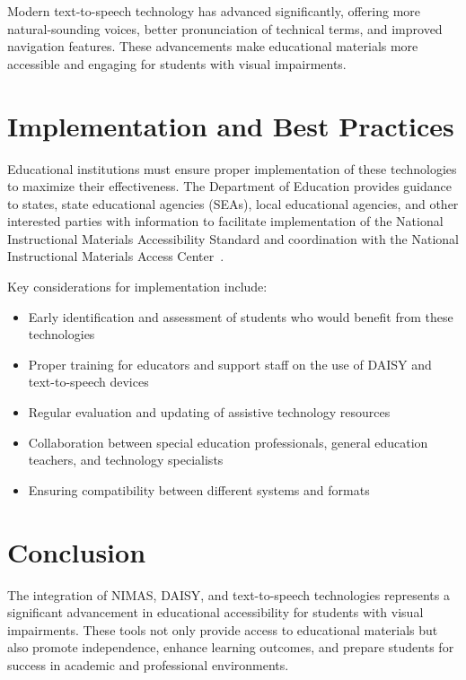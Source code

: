 Modern text-to-speech technology has advanced significantly, offering more natural-sounding voices, better pronunciation of technical terms, and improved navigation features. These advancements make educational materials more accessible and engaging for students with visual impairments.

\section{Implementation and Best Practices}\label{implementation}

Educational institutions must ensure proper implementation of these technologies to maximize their effectiveness. The Department of Education provides guidance to states, state educational agencies (SEAs), local educational agencies, and other interested parties with information to facilitate implementation of the National Instructional Materials Accessibility Standard and coordination with the National Instructional Materials Access Center~\cite{USDeptEducation2021}.

Key considerations for implementation include:

\begin{itemize}
    \item Early identification and assessment of students who would benefit from these technologies
    \item Proper training for educators and support staff on the use of DAISY and text-to-speech devices
    \item Regular evaluation and updating of assistive technology resources
    \item Collaboration between special education professionals, general education teachers, and technology specialists
    \item Ensuring compatibility between different systems and formats
\end{itemize}

\section{Conclusion}\label{conclusion}

The integration of NIMAS, DAISY, and text-to-speech technologies represents a significant advancement in educational accessibility for students with visual impairments. These tools not only provide access to educational materials but also promote independence, enhance learning outcomes, and prepare students for success in academic and professional environments.

